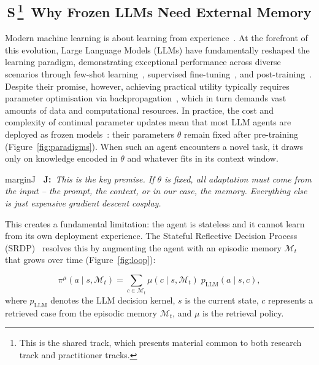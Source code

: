 \documentclass[11pt,a4paper]{article}
\newcommand{\profJ}[1]{%
  \begin{inlinenote}{marginJ}%
  \textbf{\color{marginJ}\faGraduationCap~J:}~\textit{#1}%
  \end{inlinenote}%
}
\newcommand{\Stag}{{\sffamily\bfseries\colorbox{sharedBG}{\color{black!60}\,S\,}}}
\begin{document}
\subsection[\Stag~Why Frozen LLMs Need External Memory]{\Stag\footnote{This is the shared track, which presents material common to both research track and practitioner tracks.}~Why Frozen LLMs Need External Memory}
\label{sec:motivation}


Modern machine learning is about learning from experience~\cite{silver2025welcome,turing2004intelligent}. At the forefront of this evolution, Large Language Models (LLMs) have fundamentally reshaped the learning paradigm, demonstrating exceptional performance across diverse scenarios through few-shot learning~\cite{brown2020language}, supervised fine-tuning~\cite{wei2022finetuned}, and post-training~\cite{guo2025deepseek}. 
Despite their promise, however, achieving practical utility typically requires parameter optimisation via backpropagation~\cite{rumelhart1986learning}, which in turn demands vast amounts of data and computational resources. In practice, the cost and complexity of continual parameter updates mean that most LLM agents are deployed as frozen models~\cite{zhao2023survey}: their parameters $\theta$ remain fixed after pre-training (Figure~\ref{fig:paradigms}). When such an agent encounters a novel task, it draws only on knowledge encoded in $\theta$ and whatever fits in its context window.

\profJ{This is the key premise. If $\theta$ is fixed, all adaptation must come from the \emph{input} -- the prompt, the context, or in our case, the memory. Everything else is just expensive gradient descent cosplay.}

This creates a fundamental limitation: the agent is stateless and it cannot learn from its own deployment experience. The Stateful Reflective Decision Process (SRDP)~\cite{wang2025memento2} resolves this by augmenting the agent with an episodic memory $\mathcal{M}_t$ that grows over time (Figure~\ref{fig:loop}):

\begin{equation}
  \pi^{\mu}(a \mid s, \mathcal{M}_t) = \sum_{c \in \mathcal{M}_t} \mu(c \mid s, \mathcal{M}_t)\; p_{\mathrm{LLM}}(a \mid s, c),
  \label{eq:composite}
\end{equation}
where $p_{\mathrm{LLM}}$ denotes the LLM decision kernel, $s$ is the current state, $c$ represents a retrieved case from the episodic memory $\mathcal{M}_t$, and $\mu$ is the retrieval policy. 
\end{document}
